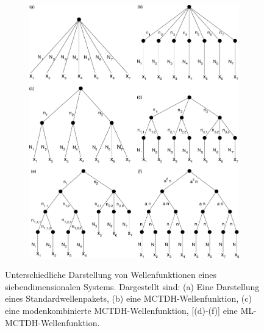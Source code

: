 \begin{figure}
    \centering
    \captionsetup[subfigure]{position=top, labelfont=bf,textfont=normalfont,singlelinecheck=off,justification=raggedright,labelformat=empty}
    \begin{subfigure}{\textwidth}
        \caption{}\label{fig:a}
    \end{subfigure}
    \begin{subfigure}{\textwidth}
        \caption{}\label{fig:b}
    \end{subfigure}
    \begin{subfigure}{\textwidth}
        \caption{}\label{fig:c}
    \end{subfigure}
    \begin{subfigure}{\textwidth}
        \caption{}\label{fig:d}
    \end{subfigure}
    \begin{subfigure}{\textwidth}
        \caption{}\label{fig:e}
    \end{subfigure}
    \begin{subfigure}{\textwidth}
        \caption{}\label{fig:f}
        \vspace*{-4cm}\includegraphics[width=\textwidth]{figures/treeDiagramms}
    \end{subfigure}
    \caption{Unterschiedliche Darstellung von Wellenfunktionen eines siebendimensionalen Systems. Dargestellt sind: (a) Eine Darstellung eines Standardwellenpakets,
      (b) eine MCTDH-Wellenfunktion, (c) eine modenkombinierte MCTDH-Wellenfunktion, [(d)-(f)] eine ML-MCTDH-Wellenfunktion.}\label{fig:tree}
\end{figure}


